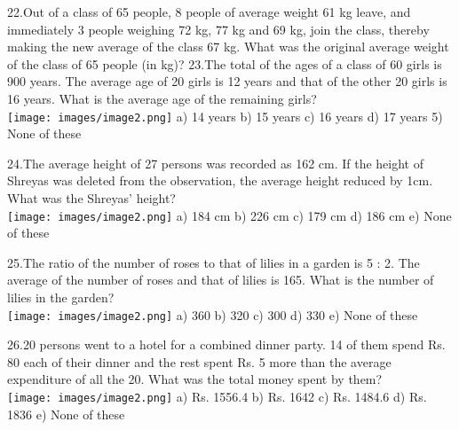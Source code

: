 \documentclass[
]{article}
\begin{document}
22.Out of a class of 65 people, 8 people of average weight 61 kg leave, and immediately 3 people weighing 72 kg, 77 kg and 69 kg, join the class, thereby making the new average of the class 67 kg. What was the original average weight of the class of 65 people (in kg)? 23.The total of the ages of a class of 60 girls is 900 years. The average age of 20 girls is 12 years and that of the other 20 girls is 16 years. What is the average age of the remaining girls?   \\
\texttt{[image: images/image2.png]}  	a) 14 years 	b) 15 years 	c) 16 years 	d) 17 years 	5) None of these

24.The average height of 27 persons was recorded as 162 cm. If the height of Shreyas was deleted from the observation, the average height reduced by 1cm. What was the Shreyas’ height?   \\
\texttt{[image: images/image2.png]}  a) 184 cm 	b) 226 cm 	c) 179 cm 	d) 186 cm 	e) None of these

25.The ratio of the number of roses to that of lilies in a garden is 5 : 2. The average of the number of roses and that of lilies is 165. What is the number of lilies in the garden?   \\
\texttt{[image: images/image2.png]}  a) 360 	b) 320 	c) 300 	d) 330 	e) None of these

26.20 persons went to a hotel for a combined dinner party. 14 of them spend Rs. 80 each of their dinner and the rest spent Rs. 5 more than the average expenditure of all the 20. What was the total money spent by them?   \\
\texttt{[image: images/image2.png]}  a) Rs. 1556.4 	b) Rs. 1642 	c) Rs. 1484.6 	d) Rs. 1836 	e) None of these
\end{document}
